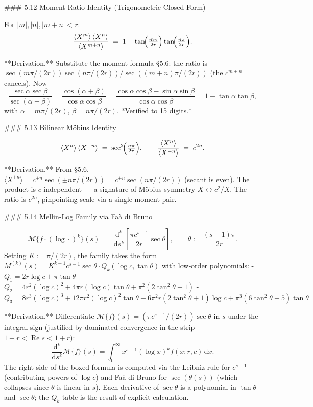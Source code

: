 ### 5.12 Moment Ratio Identity (Trigonometric Closed Form)

For $|m|,|n|,|m+n|<r$:
$$
\frac{\langle X^{m}\rangle\,\langle X^{n}\rangle}{\langle X^{m+n}\rangle} \;=\; 1 - \tan\!\Bigl(\tfrac{m\pi}{2r}\Bigr)\tan\!\Bigl(\tfrac{n\pi}{2r}\Bigr).
$$

**Derivation.** Substitute the moment formula §5.6: the ratio is $\sec(m\pi/(2r))\sec(n\pi/(2r))/\sec((m+n)\pi/(2r))$ (the $c^{m+n}$ cancels). Now
$$
\frac{\sec\alpha\sec\beta}{\sec(\alpha+\beta)} = \frac{\cos(\alpha+\beta)}{\cos\alpha\cos\beta} = \frac{\cos\alpha\cos\beta - \sin\alpha\sin\beta}{\cos\alpha\cos\beta} = 1 - \tan\alpha\tan\beta,
$$
with $\alpha = m\pi/(2r)$, $\beta = n\pi/(2r)$. *Verified to 15 digits.*

### 5.13 Bilinear Möbius Identity

$$
\langle X^{n}\rangle\,\langle X^{-n}\rangle \;=\; \sec^{2}\!\Bigl(\tfrac{n\pi}{2r}\Bigr),\qquad \frac{\langle X^{n}\rangle}{\langle X^{-n}\rangle} \;=\; c^{2n}.
$$

**Derivation.** From §5.6, $\langle X^{\pm n}\rangle = c^{\pm n}\sec(\pm n\pi/(2r)) = c^{\pm n}\sec(n\pi/(2r))$ (secant is even). The product is $c$‑independent — a signature of Möbius symmetry $X\leftrightarrow c^{2}/X$. The ratio is $c^{2n}$, pinpointing scale via a single moment pair.

### 5.14 Mellin‑Log Family via Faà di Bruno

$$
\mathcal M\bigl\{f\cdot(\log\cdot)^{k}\bigr\}(s) \;=\; \frac{\mathrm d^{k}}{\mathrm ds^{k}}\!\left[\frac{\pi c^{s-1}}{2r}\sec\theta\right],\qquad \theta := \frac{(s-1)\pi}{2r}.
$$
Setting $K := \pi/(2r)$, the family takes the form $M^{(k)}(s) = K^{k+1}c^{s-1}\sec\theta\cdot Q_{k}(\log c,\tan\theta)$ with low‑order polynomials:
- $Q_{1} = 2r\log c + \pi\tan\theta$
- $Q_{2} = 4r^{2}(\log c)^{2} + 4\pi r(\log c)\tan\theta + \pi^{2}(2\tan^{2}\theta+1)$
- $Q_{3} = 8r^{3}(\log c)^{3} + 12\pi r^{2}(\log c)^{2}\tan\theta + 6\pi^{2}r(2\tan^{2}\theta+1)\log c + \pi^{3}(6\tan^{2}\theta+5)\tan\theta$

**Derivation.** Differentiate $\mathcal M\{f\}(s) = (\pi c^{s-1}/(2r))\sec\theta$ in $s$ under the integral sign (justified by dominated convergence in the strip $1-r<\operatorname{Re} s<1+r$):
$$
\frac{\mathrm d^{k}}{\mathrm ds^{k}}\mathcal M\{f\}(s) = \int_{0}^{\infty}x^{s-1}(\log x)^{k}f(x;r,c)\,\mathrm dx.
$$
The right side of the boxed formula is computed via the Leibniz rule for $c^{s-1}$ (contributing powers of $\log c$) and Faà di Bruno for $\sec(\theta(s))$ (which collapses since $\theta$ is linear in $s$). Each derivative of $\sec\theta$ is a polynomial in $\tan\theta$ and $\sec\theta$; the $Q_{k}$ table is the result of explicit calculation.

